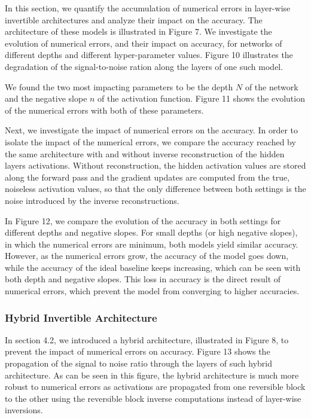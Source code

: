 \documentclass[twocolumn]{bmcart}
\begin{document}
In this section, we quantify the accumulation of numerical errors in layer-wise invertible architectures and analyze their impact on the accuracy.
The architecture of these models is illustrated in Figure 7.
We investigate the evolution of numerical errors, and their impact on accuracy, for networks of different depths and different hyper-parameter values.
Figure 10 illustrates the degradation of the signal-to-noise ration along the layers of one such model.

We found the two most impacting parameters to be the depth $N$ of the network and the negative slope $n$ of the activation function.
Figure 11 shows the evolution of the numerical errors with both of these parameters.

Next, we investigate the impact of numerical errors on the accuracy.
In order to isolate the impact of the numerical errors, 
we compare the accuracy reached by the same architecture with and without inverse reconstruction of the hidden layers activations.
Without reconstruction, the hidden activation values are stored along the forward pass and the gradient updates are computed from the true, 
noiseless activation values, so that the only difference between both settings is the noise introduced by the inverse reconstructions.

In Figure 12, we compare the evolution of the accuracy in both settings for different depths and negative slopes.
For small depths (or high negative slopes), in which the numerical errors are minimum, both models yield similar accuracy.
However, as the numerical errors grow, the accuracy of the model goes down, 
while the accuracy of the ideal baseline keeps increasing,
which can be seen with both depth and negative slopes.
This loss in accuracy is the direct result of numerical errors, 
which prevent the model from converging to higher accuracies.

\subsubsection{Hybrid Invertible Architecture}

In section 4.2, we introduced a hybrid architecture,
illustrated in Figure 8, to prevent the impact of numerical errors on accuracy.
Figure 13 shows the propagation of the signal to noise ratio through the layers of such hybrid architecture.
As can be seen in this figure, the hybrid architecture is much more robust to numerical errors as activations 
are propagated from one reversible block to the other using the reversible block inverse computations instead of layer-wise inversions.
\end{document}
